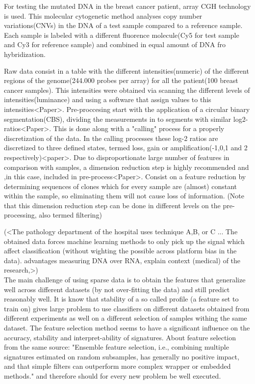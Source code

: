 \documentclass[a4paper]{article}
\begin{document}
For testing the mutated DNA in the breast cancer patient, array CGH technology is used. This molecular cytogenetic method analyses copy number variations(CNVs) in the DNA of a test sample compared to a reference sample. Each sample is labeled with a different  fluorence molecule(Cy5 for test sample and Cy3 for reference sample) and combined in equal amount of DNA fro hybridization. 

Raw data consist in a table with the different intensities(numeric) of the different regions of the genome(244.000 probes per array) for all the patient(100 breast cancer samples). This intensities were obtained via scanning the different levels of intensities(luminance) and using a software that assign values to this intensities<Paper>. Pre-proccesing start with the application of a circular binary segmentation(CBS), dividing the measurements in to segments with similar log2-ratios<Paper>. This is done along with a "calling" process for a properly discretization of the data. In the calling processes these log-2 ratios are discretized to three defined states, termed loss, gain or amplification(-1,0,1 and 2 respectively)<paper>. Due to disproportionate large number of features in comparison with samples, a dimension reduction step is highly recommended and ,in this case,  included in pre-process<Paper>.
Consist on a feature reduction by determining sequences of clones which for every sample are (almost) constant within the sample, so eliminating them will not cause loss of information.
(Note that this dimension reduction step can be done in different levels on the pre-processing, also termed filtering)



(<The pathology department of the hospital uses technique A,B, or C ... The obtained data forces machine learning methods to only pick up the signal which affect classification (without wighting the possible across platform bias in the data). 
advantages measuring DNA over RNA, explain context (medical) of the research,>)
\\   

The main challenge of using sparse data is to obtain the features that generalize well across different datasets (by not over-fitting the data) and still predict reasonably well. It is know that stability of a so called profile (a feature set to train on) gives large problem to use classifiers on different datasets obtained from different experiments as well on a different selection of samples withing the same dataset. The feature selection method seems to have a significant influence on the accuracy, stability and interpret-ability of signatures.\cite{haury} About feature selection from the same source: "Ensemble feature selection, i.e., combining multiple signatures estimated on random subsamples, has generally no positive impact, and that simple filters can outperform more complex wrapper or embedded methods." and therefore should for every new problem be well executed.\\ 
\end{document}
